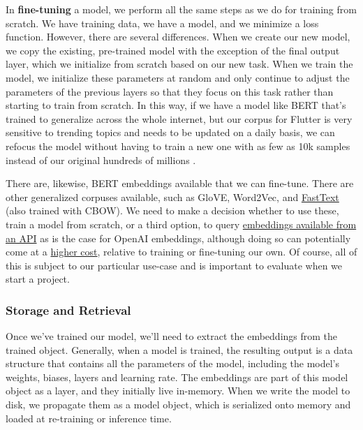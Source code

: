 \documentclass[11pt, table]{diazessay} %
\begin{document}
\begin{sloppypar}
In \textbf{fine-tuning} a model, we perform all the same steps as we do for training from scratch. We have training data, we have a model, and we minimize a loss function. However, there are several differences. When we create our new model, we copy the existing, pre-trained model with the exception of the final output layer, which we initialize from scratch based on our new task. When we train the model, we initialize these parameters at random and only continue to adjust the parameters of the previous layers so that they focus on this task rather than starting to train from scratch. In this way, if we have a model like BERT that's trained to generalize across the whole internet, but our corpus for Flutter is very sensitive to trending topics and needs to be updated on a daily basis, we can refocus the model without having to train a new one with as few as 10k samples instead of our original hundreds of millions \citep{zhang2020revisiting}.

There are, likewise, BERT embeddings available that we can fine-tune. There are other generalized corpuses available, such as GloVE, Word2Vec, and \href{https://fasttext.cc/docs/en/crawl-vectors.html}{FastText} (also trained with CBOW). We need to make a decision whether to use these, train a model from scratch, or a third option, to query \href{https://platform.openai.com/docs/guides/embeddings/limitations-risks}{embeddings available from an API} as is the case for OpenAI embeddings, although doing so can potentially come at a \href{https://github.com/ray-project/llm-numbers#101----cost-ratio-of-openai-embedding-to-self-hosted-embedding}{higher cost}, relative to training or fine-tuning our own. Of course, all of this is subject to our particular use-case and is important to evaluate when we start a project.

\subsubsection{Storage and Retrieval}

Once we've trained our model, we'll need to extract the embeddings from the trained object. Generally, when a model is trained, the resulting output is a data structure that contains all the parameters of the model, including the model's weights, biases, layers and learning rate. The embeddings are part of this model object as a layer, and they initially live in-memory. When we write the model to disk, we propagate them as a model object, which is serialized onto memory and loaded at re-training or inference time.


\end{sloppypar}
\end{document}
